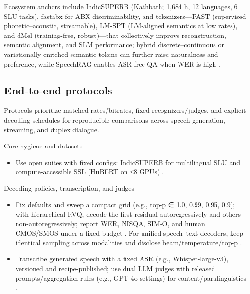 Ecosystem anchors include IndicSUPERB (Kathbath; 1,684 h, 12 languages, 6 SLU tasks), fastabx for ABX discriminability, and tokenizers—PAST (supervised phonetic–acoustic, streamable), LM‑SPT (LM‑aligned semantics at low rates), and dMel (training-free, robust)—that collectively improve reconstruction, semantic alignment, and SLM performance; hybrid discrete–continuous or variationally enriched semantic tokens can further raise naturalness and preference, while SpeechRAG enables ASR-free QA when WER is high \cite{entry2025indicsuperbspeechprocessinguniversalperf,poli2025fastabxlibraryefficientcomputationabxdis,har-tuv2025pastphoneticacousticspeechtokenizer,jo2025lmsptalignedsemanticdistillationspeechto,bai2025dmelspeechtokenizationmadesimple,verma2024whispergpthybridrepresentationaudiolarge,chen2025variationalframeworkimprovingnaturalness,min2025speechretrievalaugmentedgenerationwithou}.

\subsection{End-to-end protocols} \label{subsec:End-to-end protocols}
Protocols prioritize matched rates/bitrates, fixed recognizers/judges, and explicit decoding schedules for reproducible comparisons across speech generation, streaming, and duplex dialogue.

Core hygiene and datasets
\begin{itemize}
  \item Use open suites with fixed configs: IndicSUPERB for multilingual SLU and compute-accessible SSL (HuBERT on ≤8 GPUs) \cite{entry2025indicsuperbspeechprocessinguniversalperf,chen2023reducingbarriersselfsupervisedlearninghu}.
\end{itemize}

Decoding policies, transcription, and judges
\begin{itemize}
  \item Fix defaults and sweep a compact grid (e.g., top‑p ∈ {1.0, 0.99, 0.95, 0.9}); with hierarchical RVQ, decode the first residual autoregressively and others non-autoregressively; report WER, NISQA, SIM‑O, and human CMOS/SMOS under a fixed budget \cite{li2024investigatingneuralaudiocodecsspeechlang}. For unified speech–text decoders, keep identical sampling across modalities and disclose beam/temperature/top‑p \cite{huang2025dynamicsuperbphase2collaborativelyexpand}.
  \item Transcribe generated speech with a fixed ASR (e.g., Whisper‑large‑v3), versioned and recipe-published; use dual LLM judges with released prompts/aggregation rules (e.g., GPT‑4o settings) for content/paralinguistics \cite{wang2025incorporatingcontextualparalinguisticund,wang2024blspemotowardsempatheticlargespeechlangu}.
\end{itemize}

